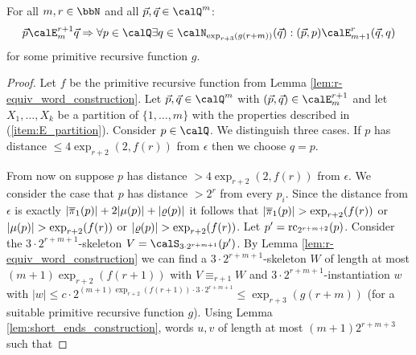 \begin{lemma}\label{lem:EF_relations}
	For all $m,r\in\bbN$ and all $\vec{p},\vec{q}\in \Qx^m$:  
	\[\vec{p} \calE^{r+1}_m \vec{q} \Rightarrow \forall p\in \Qx \exists q\in \calN_{\exp_{r+3}(g(r+m))}(\vec{q}): (\vec{p}, p) \calE^{r}_{m+1} (\vec{q}, q)\]
	for some primitive recursive function $g$.
\end{lemma}
\begin{proof}
	Let $f$ be the primitive recursive function from Lemma \ref{lem:r-equiv_word_construction}.
	Let $\vec{p}, \vec{q} \in \Qx^m$ with $(\vec{p}, \vec{q}) \in \calE^{r+1}_m$ and 
	let $X_1,\ldots,X_k$ be a partition of $\{1,\ldots,m\}$ with the properties described in (\ref{item:E_partition}). 
	Consider $p\in \Qx$. We distinguish three cases.
	If $p$ has distance $\leq 4\exp_{r+2}(2, f(r))$ from $\epsilon$ then we choose $q=p$.
	
	From now on suppose $p$ has distance $> 4\exp_{r+2}(2, f(r))$ from $\epsilon$.
	We consider the case that $p$ has distance $>2^r$ from every $p_i$.
	Since the distance from $\epsilon$ is exactly $|\overline{\pi}_1(p)| + 2|\mu(p)| + |\varrho(p)|$ it follows that $|\overline{\pi}_1(p)| > \exp_{r+2}(f(r))$ or $|\mu(p)| > \exp_{r+2}(f(r))$ or $|\varrho(p)| > \exp_{r+2}(f(r))$. 
	Let $p'= \operatorname{rc}_{2^{r+m+2}}(p)$.  Consider 
	the $3\cdot 2^{r+m+1}$-skeleton $V = \calS_{3\cdot 2^{r+m+1}}(p')$. By Lemma \ref{lem:r-equiv_word_construction} we can find a $3\cdot 2^{r+m+1}$-skeleton $W$ of length at most $(m+1)\exp_{r+2}(f(r+1))$ with $V \equiv_{r+1} W$ and $3\cdot 2^{r+m+1}$-instantiation $w$ with $|w|\leq  c\cdot 2^{(m+1)\exp_{r+2}(f(r+1)) \cdot 3\cdot 2^{r+m+1}}  \leq \exp_{r+3}(g(r+m))$ (for a suitable primitive recursive function $g$). Using Lemma \ref{lem:short_ends_construction}, words $u,v$ of length at most 
	$(m+1)2^{r+m+3}$ such that 
	

\end{proof}
